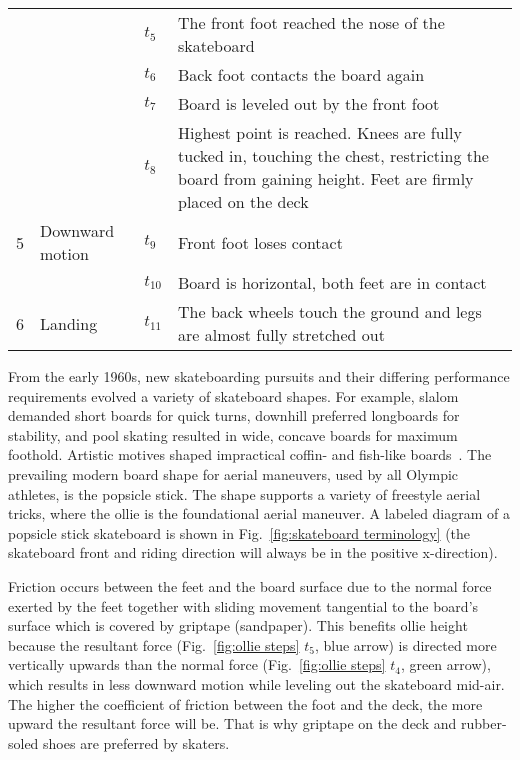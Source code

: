 \documentclass[default,iicol,pdflatex]{sn-jnl}
\begin{document}
\begin{figure*}[!t]
{\begin{center}
\begin{tabular}{p{0.3 cm} p{1.6cm} p{0.3cm} p{12.4cm}}
                  &     & $t_5$ & The front foot reached the nose of the skateboard \\
                   &   & $t_6$ & Back foot contacts the board again \\
                    & & $t_7$ & Board is leveled out by the front foot \\
                    & & $t_8$ & Highest point is reached. Knees are fully tucked in, touching the chest, restricting the board from gaining height. Feet are firmly placed on the deck \\
     5 & Downward motion & $t_9$ & Front foot loses contact \\
         &            & $t_{10}$& Board is horizontal, both feet are in contact \\
     6 & Landing         & $t_{11}$& The back wheels touch the ground and legs are almost fully stretched out \\
 \end{tabular}
 \end{center}
}
  \label{fig:ollie steps}
\end{figure*}

From the early 1960s, new skateboarding pursuits and their differing performance requirements evolved a variety of skateboard shapes.
For example, slalom demanded short boards for quick turns, downhill preferred longboards for stability, and pool skating resulted in wide, concave boards for maximum foothold. 
Artistic motives shaped impractical coffin- and
fish-like boards~\cite{prentiss_get_2011}.
The prevailing modern board shape for aerial maneuvers, used by all Olympic athletes, is the popsicle stick.
The shape supports a variety of freestyle aerial tricks, where the ollie is the foundational aerial maneuver.
A labeled diagram of a popsicle stick skateboard is shown in Fig.~\ref{fig:skateboard terminology} (the skateboard front and riding direction will always be in the positive x-direction).

Friction occurs between the feet and the board surface due to the normal force exerted by the feet together with sliding movement tangential to the board's surface which is covered by griptape (sandpaper).
This benefits ollie height because the resultant force (Fig.~\ref{fig:ollie steps} $t_5$, blue arrow) is directed more vertically upwards than the normal force (Fig.~\ref{fig:ollie steps} $t_4$, green arrow), which results in less downward motion while leveling out the skateboard mid-air.
The higher the coefficient of friction between the foot and the deck, the more upward the resultant force will be.
That is why griptape on the deck and rubber-soled shoes are preferred by skaters.
\end{document}
